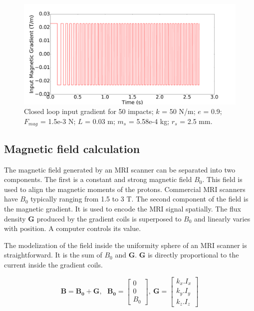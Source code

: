 \documentclass[letterpaper, 10 pt, conference]{ieeeconf}  %
\begin{document}
\begin{figure}
	\includegraphics[width=\linewidth]{CLinput.pdf}
	\caption{Closed loop input gradient for 50 impacts; $k$ = 50 N/m; $e$ = 0.9; $F_{mag}$ = 1.5e-3 N; $L$ = 0.03 m; $m_s$ = 5.58e-4 kg; $r_s$ = 2.5 mm.}
\label{CLinput}
	
\end{figure}

\subsection{Magnetic field calculation}
\label{magfield}
The magnetic field generated by an MRI scanner can be separated into two components. The first is a constant and strong magnetic field $B_0$. This field is used to align the magnetic moments of the protons. Commercial MRI scanners have $B_0$ typically ranging from 1.5 to 3 T. The second component of the field is the magnetic gradient. It is used to encode the MRI signal spatially. The flux density $\mathbf{G}$ produced by the gradient coils is superposed to $B_0$ and linearly varies with position. A computer controls its value.\par
The modelization of the field inside the uniformity sphere of an MRI scanner is straightforward. It is the sum of $B_0$ and $\mathbf{G}$. $\mathbf{G}$ is directly proportional to the current inside the gradient coils. 

\begin{equation}
\mathbf{B}=\mathbf{B_0}+\mathbf{G},~~~
\mathbf{B_0}=\begin{bmatrix}
0\\ 
0\\ 
B_0
\end{bmatrix},~
\mathbf{G}=\begin{bmatrix}
k_x.I_x\\ 
k_y.I_y\\ 
k_z.I_z
\end{bmatrix}
\label{magfield}
\end{equation}
\end{document}
